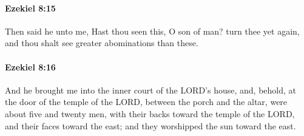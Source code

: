 		\paragraph{Ezekiel 8:15} %
			\label{EZEKIEL-8-15}

			Then said he unto me, Hast thou seen this, O son of man? turn thee yet again, and thou shalt see greater abominations than these.


		\paragraph{Ezekiel 8:16} %
			\label{EZEKIEL-8-16}

			And he brought me into the inner court of the LORD’s house, and, behold, at the door of the temple of the LORD, between the porch and the altar, were about five and twenty men, with their backs toward the temple of the LORD, and their faces toward the east; and they worshipped the sun toward the east.

